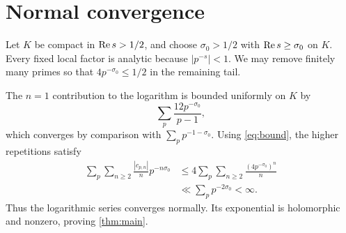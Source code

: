\appendix
\section{Normal convergence}\label{sec:convergence}

Let $K$ be compact in $\operatorname{Re} s>1/2$, and choose
$\sigma_0>1/2$ with $\operatorname{Re} s\ge\sigma_0$ on $K$.  Every fixed local factor
is analytic because $|p^{-s}|<1$.  We may remove finitely many primes so that
$4p^{-\sigma_0}\le1/2$ in the remaining tail.

The $n=1$ contribution to the logarithm is bounded uniformly on $K$ by
\[
 \sum_p\frac{12p^{-\sigma_0}}{p-1},
\]
which converges by comparison with $\sum_pp^{-1-\sigma_0}$.  Using
\eqref{eq:bound}, the higher repetitions satisfy
\begin{align*}
 \sum_p\sum_{n\ge2}\frac{|c_{p,n}|}{n}p^{-n\sigma_0}
 &\le4\sum_p\sum_{n\ge2}\frac{(4p^{-\sigma_0})^n}{n}\\
 &\ll\sum_pp^{-2\sigma_0}<\infty.
\end{align*}
Thus the logarithmic series converges normally.  Its exponential is
holomorphic and nonzero, proving \cref{thm:main}.


